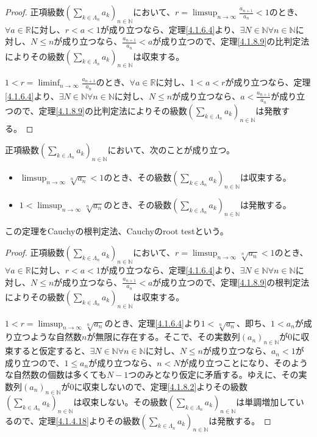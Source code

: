 \documentclass[dvipdfmx]{jsarticle}
\begin{document}
\begin{proof}
正項級数$\left( \sum_{k \in \varLambda_{n}} a_{k} \right)_{n \in \mathbb{N}}$において、$r = \limsup_{n \rightarrow \infty}\frac{a_{n + 1}}{a_{n}} < 1$のとき、$\forall a \in \mathbb{R}$に対し、$r < a < 1$が成り立つなら、定理\ref{4.1.6.4}より、$\exists N \in \mathbb{N}\forall n \in \mathbb{N}$に対し、$N \leq n$が成り立つなら、$\frac{a_{n + 1}}{a_{n}} < a$が成り立つので、定理\ref{4.1.8.9}の比判定法によりその級数$\left( \sum_{k \in \varLambda_{n}} a_{k} \right)_{n \in \mathbb{N}}$は収束する。\par
$1 < r = \liminf_{n \rightarrow \infty}\frac{a_{n + 1}}{a_{n}}$のとき、$\forall a \in \mathbb{R}$に対し、$1 < a < r$が成り立つなら、定理\ref{4.1.6.4}より、$\exists N \in \mathbb{N}\forall n \in \mathbb{N}$に対し、$N \leq n$が成り立つなら、$a < \frac{a_{n + 1}}{a_{n}}$が成り立つので、定理\ref{4.1.8.9}の比判定法によりその級数$\left( \sum_{k \in \varLambda_{n}} a_{k} \right)_{n \in \mathbb{N}}$は発散する。
\end{proof}
\begin{thm}[Cauchyの根判定法]\label{4.1.8.12}
正項級数$\left( \sum_{k \in \varLambda_{n}} a_{k} \right)_{n \in \mathbb{N}}$において、次のことが成り立つ。
\begin{itemize}
\item
  $\limsup_{n \rightarrow \infty}\sqrt[n]{a_{n}} < 1$のとき、その級数$\left( \sum_{k \in \varLambda_{n}} a_{k} \right)_{n \in \mathbb{N}}$は収束する。
\item
  $1 < \limsup_{n \rightarrow \infty}\sqrt[n]{a_{n}}$のとき、その級数$\left( \sum_{k \in \varLambda_{n}} a_{k} \right)_{n \in \mathbb{N}}$は発散する。
\end{itemize}
この定理をCauchyの根判定法、Cauchyのroot testという。
\end{thm}
\begin{proof}
正項級数$\left( \sum_{k \in \varLambda_{n}} a_{k} \right)_{n \in \mathbb{N}}$において、$r = \limsup_{n \rightarrow \infty}\sqrt[n]{a_{n}} < 1$のとき、$\forall a \in \mathbb{R}$に対し、$r < a < 1$が成り立つなら、定理\ref{4.1.6.4}より、$\exists N \in \mathbb{N}\forall n \in \mathbb{N}$に対し、$N \leq n$が成り立つなら、$\frac{a_{n + 1}}{a_{n}} < a$が成り立つので、定理\ref{4.1.8.9}の根判定法によりその級数$\left( \sum_{k \in \varLambda_{n}} a_{k} \right)_{n \in \mathbb{N}}$は収束する。\par
$1 < r = \limsup_{n \rightarrow \infty}\sqrt[n]{a_{n}}$のとき、定理\ref{4.1.6.4}より$1 < \sqrt[n]{a_{n}}$、即ち、$1 < a_{n}$が成り立つような自然数$n$が無限に存在する。そこで、その実数列$\left( a_{n} \right)_{n \in \mathbb{N}}$が$0$に収束すると仮定すると、$\exists N \in \mathbb{N}\forall n \in \mathbb{N}$に対し、$N \leq n$が成り立つなら、$a_{n} < 1$が成り立つので、$1 \leq a_{n}$が成り立つなら、$n < N$が成り立つことになり、そのような自然数の個数は多くても$N - 1$つのみとなり仮定に矛盾する。ゆえに、その実数列$\left( a_{n} \right)_{n \in \mathbb{N}}$が$0$に収束しないので、定理\ref{4.1.8.2}よりその級数$\left( \sum_{k \in \varLambda_{n}} a_{k} \right)_{n \in \mathbb{N}}$は収束しない。その級数$\left( \sum_{k \in \varLambda_{n}} a_{k} \right)_{n \in \mathbb{N}}$は単調増加しているので、定理\ref{4.1.4.18}よりその級数$\left( \sum_{k \in \varLambda_{n}} a_{k} \right)_{n \in \mathbb{N}}$は発散する。
\end{proof}
\end{document}
